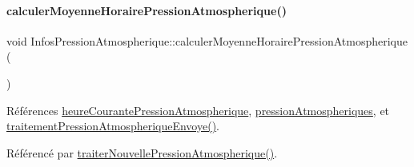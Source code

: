 \paragraph{\texorpdfstring{calculer\+Moyenne\+Horaire\+Pression\+Atmospherique()}{calculerMoyenneHorairePressionAtmospherique()}}
{\footnotesize\ttfamily void Infos\+Pression\+Atmospherique\+::calculer\+Moyenne\+Horaire\+Pression\+Atmospherique (\begin{DoxyParamCaption}{ }\end{DoxyParamCaption})\hspace{0.3cm}{\ttfamily [private]}}



Références \hyperlink{class_infos_pression_atmospherique_ab3fa5c89841cf03f371ef7848b8bc958}{heure\+Courante\+Pression\+Atmospherique}, \hyperlink{class_infos_pression_atmospherique_a38218b11dc9fb22aca7525f93155a26c}{pression\+Atmospheriques}, et \hyperlink{class_infos_pression_atmospherique_af759842c05a1e59b56d433e823bee341}{traitement\+Pression\+Atmospherique\+Envoye()}.



Référencé par \hyperlink{class_infos_pression_atmospherique_ab280f47f2a1376222a45fde8638489d2}{traiter\+Nouvelle\+Pression\+Atmospherique()}.


